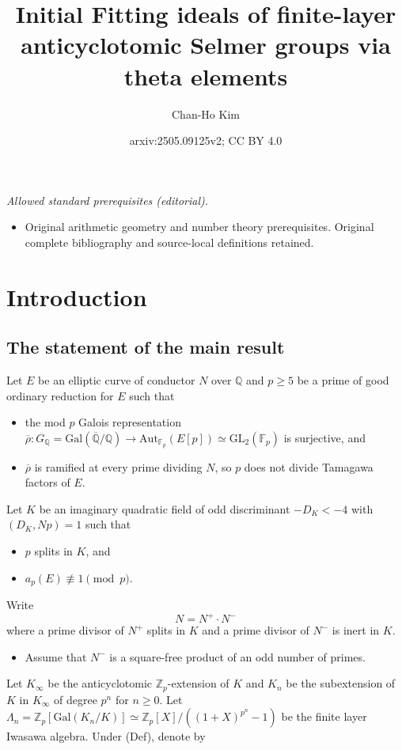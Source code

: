 \documentclass[11pt]{amsart}
\title{Initial Fitting ideals of finite-layer anticyclotomic Selmer groups via theta elements}
\author{Chan-Ho Kim}
\date{arxiv:2505.09125v2; CC BY 4.0}
\numberwithin{equation}{section}
\theoremstyle{definition}
\begin{document}
\maketitle
\noindent\textit{Allowed standard prerequisites (editorial).}\begin{itemize}
\item Original arithmetic geometry and number theory prerequisites. Original complete bibliography and source-local definitions retained.
\end{itemize}\medskip
\section{Introduction}
\subsection{The statement of the main result}
Let $E$ be an elliptic curve of conductor $N$ over $\mathbb{Q}$ and $p \geq 5$ be a prime of good ordinary reduction for $E$ such that
\begin{itemize}
\item[(Im)]  the mod $p$ Galois representation
$\overline{\rho} : G_{\mathbb{Q}} = \mathrm{Gal}(\overline{\mathbb{Q}}/\mathbb{Q}) \to \mathrm{Aut}_{\mathbb{F}_p}(E[p]) \simeq \mathrm{GL}_2(\mathbb{F}_p)$ is surjective, and
\item[(Ram)] $\overline{\rho}$ is ramified at every prime dividing $N$, so $p$ does not divide Tamagawa factors of $E$.
\end{itemize}
Let $K$ be an imaginary quadratic field of odd discriminant $-D_K  < -4$ with $(D_K, Np) = 1$ such that
\begin{itemize}
\item[(Spl)] $p$ splits in $K$, and
\item[(Na)] $a_p(E) \not\equiv 1 \pmod{p}$.
\end{itemize}
Write 
$$N = N^+ \cdot N^-$$
 where a prime divisor of $N^+$ splits in $K$ and a prime divisor of $N^- $ is inert in $K$.
\begin{itemize}
\item[(Def)] Assume that $N^-$ is a square-free product of an odd number of primes.
\end{itemize}
Let $K_\infty$ be the anticyclotomic $\mathbb{Z}_p$-extension of $K$ and $K_n$ be the subextension of $K$ in $K_\infty$ of degree $p^n$ for $n \geq 0$.
Let $\Lambda_n = \mathbb{Z}_p[\mathrm{Gal}(K_n/K)] \simeq \mathbb{Z}_p[X]/( (1+X)^{p^n} - 1 )$ be the finite layer Iwasawa algebra.
Under (Def), denote by
\end{document}
